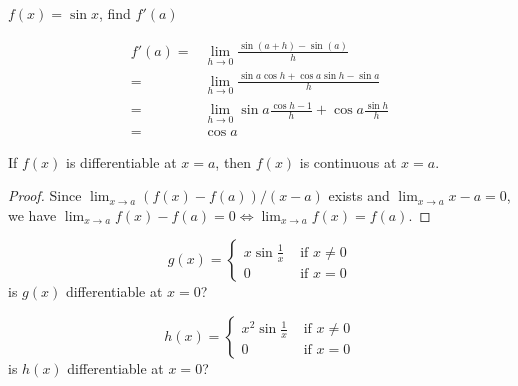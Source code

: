 \begin{exmp}
$f(x) = \sin x$, find $f'(a)$
\end{exmp}

\begin{solution}
\begin{align*}
    f'(a) = & \lim_{h\to 0} \frac{\sin (a+h) - \sin (a)}{h} \\
    = & \lim_{h\to 0} \frac{\sin a\cos h + \cos a\sin h - \sin a}{h} \\
    = & \lim_{h\to 0} \sin a \frac{\cos h - 1}{h} + \cos a \frac{\sin h}{h}\\
    = & \cos a
\end{align*}
\end{solution}

\begin{thm}
If $f(x)$ is differentiable at $x=a$, then $f(x)$ is continuous at $x=a$.
\end{thm}
\begin{proof}
Since $\lim_{x\to a} (f(x)-f(a))/(x-a)$ exists and $\lim_{x\to a } x-a = 0$, we have $\lim_{x\to a} f(x) - f(a) = 0 \Longleftrightarrow \lim_{x\to a} f(x) = f(a)$.
\end{proof}

\begin{exmp}
\begin{equation*}
    g(x) = \begin{cases}
    x\sin \frac{1}{x} & \text{ if } x\neq 0 \\
    0 & \text{ if } x= 0
    \end{cases}
\end{equation*}
is $g(x)$ differentiable at $x=0$?
\end{exmp}

\begin{exmp}
\begin{equation*}
    h(x) = \begin{cases}
    x^2\sin \frac{1}{x} & \text{ if } x\neq 0 \\
    0 & \text{ if } x= 0
    \end{cases}
\end{equation*}
is $h(x)$ differentiable at $x=0$?
\end{exmp}